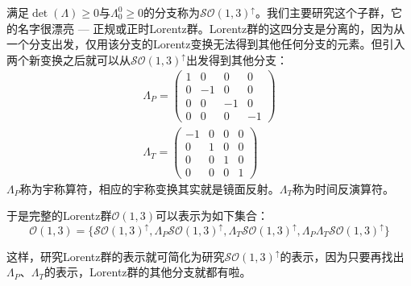 满足$\det(\Lambda) \geq 0$与$\Lambda_0^0 \geq 0$的分支称为$\mathcal{SO}(1, 3)^{\uparrow}$。我们主要研究这个子群，它的名字很漂亮 --- 正规或正时Lorentz群。Lorentz群的这四分支是分离的，因为从一个分支出发，仅用该分支的Lorentz变换无法得到其他任何分支的元素。但引入两个新变换之后就可以从$\mathcal{SO}(1, 3)^\uparrow$出发得到其他分支：
\begin{align}
	\label{equ3.132}
	\Lambda_P =
		\begin{pmatrix}
			1 & 0 & 0 & 0 \\
			0 & -1 & 0 & 0 \\
			0 & 0 & -1 & 0 \\
			0 & 0 & 0 & -1
		\end{pmatrix}
\\
	\label{equ3.133}
	\Lambda_T =
		\begin{pmatrix}
			-1 & 0 & 0 & 0 \\
			0 & 1 & 0 & 0 \\
			0 & 0 & 1 & 0 \\
			0 & 0 & 0 & 1
		\end{pmatrix}
\end{align}
$\Lambda_P$称为宇称算符，相应的宇称变换其实就是镜面反射。$\Lambda_T$称为时间反演算符。

于是完整的Lorentz群$\mathcal{O}(1, 3)$可以表示为如下集合：
\begin{equation}
	\label{equ3.134}
	\mathcal{O}(1, 3) = \{ \mathcal{SO}(1, 3)^\uparrow, \Lambda_P \mathcal{SO}(1, 3)^\uparrow, \Lambda_T \mathcal{SO}(1, 3)^\uparrow, \Lambda_P \Lambda_T \mathcal{SO}(1, 3)^\uparrow \}
\end{equation}

这样，研究Lorentz群的表示就可简化为研究$\mathcal{SO}(1, 3)^\uparrow$的表示，因为只要再找出$\Lambda_P$、$\Lambda_T$的表示，Lorentz群的其他分支就都有啦。

